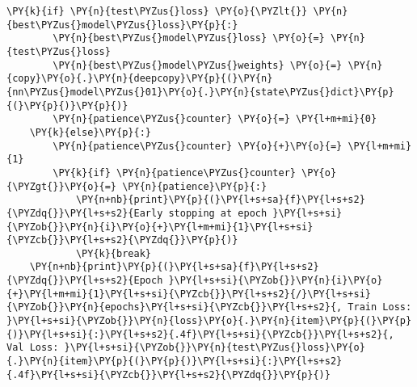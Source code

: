 \begin{tcolorbox}[breakable, size=fbox, boxrule=1pt, pad at break*=1mm,colback=cellbackground, colframe=cellborder]
\begin{Verbatim}[commandchars=\\\{\}]
    \PY{k}{if} \PY{n}{test\PYZus{}loss} \PY{o}{\PYZlt{}} \PY{n}{best\PYZus{}model\PYZus{}loss}\PY{p}{:}
        \PY{n}{best\PYZus{}model\PYZus{}loss} \PY{o}{=} \PY{n}{test\PYZus{}loss}
        \PY{n}{best\PYZus{}model\PYZus{}weights} \PY{o}{=} \PY{n}{copy}\PY{o}{.}\PY{n}{deepcopy}\PY{p}{(}\PY{n}{nn\PYZus{}model\PYZus{}01}\PY{o}{.}\PY{n}{state\PYZus{}dict}\PY{p}{(}\PY{p}{)}\PY{p}{)}
        \PY{n}{patience\PYZus{}counter} \PY{o}{=} \PY{l+m+mi}{0}
    \PY{k}{else}\PY{p}{:}
        \PY{n}{patience\PYZus{}counter} \PY{o}{+}\PY{o}{=} \PY{l+m+mi}{1}
        \PY{k}{if} \PY{n}{patience\PYZus{}counter} \PY{o}{\PYZgt{}}\PY{o}{=} \PY{n}{patience}\PY{p}{:}
            \PY{n+nb}{print}\PY{p}{(}\PY{l+s+sa}{f}\PY{l+s+s2}{\PYZdq{}}\PY{l+s+s2}{Early stopping at epoch }\PY{l+s+si}{\PYZob{}}\PY{n}{i}\PY{o}{+}\PY{l+m+mi}{1}\PY{l+s+si}{\PYZcb{}}\PY{l+s+s2}{\PYZdq{}}\PY{p}{)}
            \PY{k}{break}
    \PY{n+nb}{print}\PY{p}{(}\PY{l+s+sa}{f}\PY{l+s+s2}{\PYZdq{}}\PY{l+s+s2}{Epoch }\PY{l+s+si}{\PYZob{}}\PY{n}{i}\PY{o}{+}\PY{l+m+mi}{1}\PY{l+s+si}{\PYZcb{}}\PY{l+s+s2}{/}\PY{l+s+si}{\PYZob{}}\PY{n}{epochs}\PY{l+s+si}{\PYZcb{}}\PY{l+s+s2}{, Train Loss: }\PY{l+s+si}{\PYZob{}}\PY{n}{loss}\PY{o}{.}\PY{n}{item}\PY{p}{(}\PY{p}{)}\PY{l+s+si}{:}\PY{l+s+s2}{.4f}\PY{l+s+si}{\PYZcb{}}\PY{l+s+s2}{, Val Loss: }\PY{l+s+si}{\PYZob{}}\PY{n}{test\PYZus{}loss}\PY{o}{.}\PY{n}{item}\PY{p}{(}\PY{p}{)}\PY{l+s+si}{:}\PY{l+s+s2}{.4f}\PY{l+s+si}{\PYZcb{}}\PY{l+s+s2}{\PYZdq{}}\PY{p}{)}
\end{Verbatim}
\end{tcolorbox}

